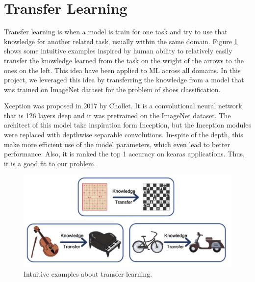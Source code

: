 \section{Transfer Learning}

Transfer learning is when a model is train for one task and try to use that knowledge for another related task, usually within the same domain.  Figure \ref{fig:transfer} shows some intuitive examples inspired by human ability to relatively easily transfer the knowledge learned from the task on the wright of the arrows to the ones on the left. This idea have been applied to ML across all domains. In this project, we leveraged this idea by transferring the knowledge from a model that was trained on ImageNet dataset for the problem of shoes classification.

Xception \cite{chollet2017xception} was proposed in 2017 by Chollet. It is a convolutional neural network that is 126 layers deep and it was pretrained on the ImageNet dataset. The architect of this model take inspiration form Inception, but the Inception modules were replaced with depthwise separable convolutions. In-spite of the depth, this make more efficient use of the model parameters, which even lead to better performance. Also, it is ranked the top 1 accuracy on kearas applications. Thus, it is a good fit to our problem. 

\begin{figure}[h]
  \centering
  \includegraphics[width=\linewidth]{figs/transfer_learning.png}
  \caption{Intuitive examples about transfer learning.}
  \label{fig:transfer}
\end{figure}
